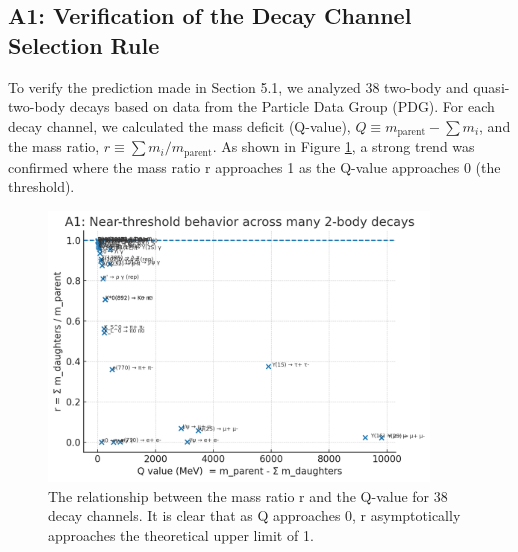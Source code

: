 \documentclass[11pt,a4paper]{article}
\begin{document}
\subsection{A1: Verification of the Decay Channel Selection Rule}
To verify the prediction made in Section 5.1, we analyzed 38 two-body and quasi-two-body decays based on data from the Particle Data Group (PDG). For each decay channel, we calculated the mass deficit (Q-value), $Q \equiv m_{\text{parent}}-\sum m_i$, and the mass ratio, $r \equiv \sum m_i/m_{\text{parent}}$. As shown in Figure \ref{fig:decay_q_value}, a strong trend was confirmed where the mass ratio r approaches 1 as the Q-value approaches 0 (the threshold).
\begin{figure}[h!]
    \centering
    \includegraphics[width=0.9\textwidth]{A1_plot.png} 
    \caption{The relationship between the mass ratio r and the Q-value for 38 decay channels. It is clear that as Q approaches 0, r asymptotically approaches the theoretical upper limit of 1.}
    \label{fig:decay_q_value}
\end{figure}
\end{document}
